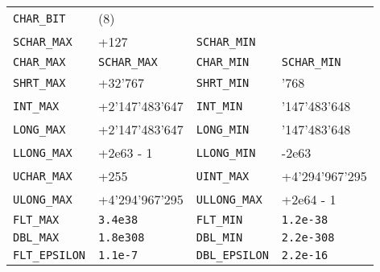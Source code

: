 \documentclass{article}
\newcommand{\cd}{\lstinline}
\begin{document}
\begin{multicols*}{3}
\begin{tabularx}{\linewidth}{
  >{\hsize=0.9\hsize}X%
  >{\hsize=1.2\hsize}X%
  >{\hsize=0.9\hsize}X%
  >{\hsize=1.2\hsize}X%
  }
  \cd{CHAR_BIT}  & (8) &   & \\
  \cd{SCHAR_MAX} & +127 & \cd{SCHAR_MIN} & -128 \\
  \cd{CHAR_MAX} & \cd{SCHAR_MAX} & \cd{CHAR_MIN} & \cd{SCHAR_MIN} \\
  \cd{SHRT_MAX} & +32'767 & \cd{SHRT_MIN} & -32'768 \\
  \cd{INT_MAX} & +2'147'483'647 & \cd{INT_MIN} & -2'147'483'648 \\
  \cd{LONG_MAX} & +2'147'483'647 & \cd{LONG_MIN} & -2'147'483'648 \\
  \cd{LLONG_MAX} & +2e63 - 1 & \cd{LLONG_MIN} & -2e63 \\
  \cd{UCHAR_MAX} & +255 & \cd{UINT_MAX} & +4'294'967'295 \\
  \cd{ULONG_MAX} & +4'294'967'295 & \cd{ULLONG_MAX} & +2e64 - 1 \\
  \cd{FLT_MAX} & \cd{3.4e38} & \cd{FLT_MIN} & \cd{1.2e-38} \\
  \cd{DBL_MAX} & \cd{1.8e308} & \cd{DBL_MIN} & \cd{2.2e-308} \\
  \cd{FLT_EPSILON} & \cd{1.1e-7} & \cd{DBL_EPSILON} & \cd{2.2e-16}
\end{tabularx}


\end{multicols*}
\end{document}
